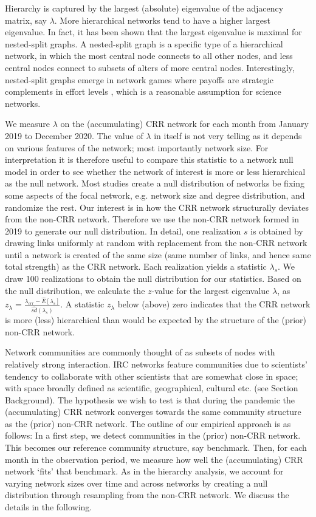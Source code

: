 Hierarchy is captured by the largest (absolute) eigenvalue of the adjacency matrix, say $\lambda$. More hierarchical networks tend to have a higher largest eigenvalue. In fact, it has been shown that the largest eigenvalue is maximal for nested-split graphs. A nested-split graph is a specific type of a hierarchical network, in which the most central node connects to all other nodes, and less central nodes connect to subsets of alters of more central nodes. Interestingly, nested-split graphs emerge in network games where payoffs are strategic complements in effort levels \citep{konig2014nestedness}, which is a reasonable assumption for science networks. 

We measure $\lambda$ on the (accumulating) CRR network for each month from January 2019 to December 2020. The value of $\lambda$ in itself is not very telling as it depends on various features of the network; most importantly network size. For interpretation it is therefore useful to compare this statistic to a network null model in order to see whether the network of interest is more or less hierarchical as the null network. Most studies create a null distribution of networks be fixing some aspects of the focal network, e.g. network size and degree distribution, and randomize the rest. Our interest is in how the CRR network structurally deviates from the non-CRR network. Therefore we use the non-CRR network formed in 2019 to generate our null distribution. In detail, one realization $s$ is obtained by drawing links uniformly at random with replacement from the non-CRR network until a network is created of the same size (same number of links, and hence same total strength) as the CRR network. Each realization yields a statistic $\lambda_s$. We draw 100 realizations to obtain the null distribution for our statistics. Based on the null distribution, we calculate the $z$-value for the largest eigenvalue $\lambda$, as $z_\lambda = \frac{\lambda_{crr} - \hat{E}\left[ \lambda_s \right]}{\widehat{sd}(\lambda_s)}$. A statistic $z_\lambda$ below (above) zero indicates that the CRR network is more (less) hierarchical than would be expected by the structure of the (prior) non-CRR network. 

Network communities are commonly thought of as subsets of nodes with relatively strong interaction. IRC networks feature communities due to scientists' tendency to collaborate with other scientists that are somewhat close in space; with space broadly defined as scientific, geographical, cultural etc. (see Section Background). The hypothesis we wish to test is that during the pandemic the (accumulating) CRR network converges towards the same community structure as the (prior) non-CRR network. The outline of our empirical approach is as follows: In a first step, we detect communities in the (prior) non-CRR network. This becomes our reference community structure, say benchmark. Then, for each month in the observation period, we measure how well the (accumulating) CRR network `fits' that benchmark. As in the hierarchy analysis, we account for varying network sizes over time and across networks by creating a null distribution through resampling from the non-CRR network. We discuss the details in the following.


